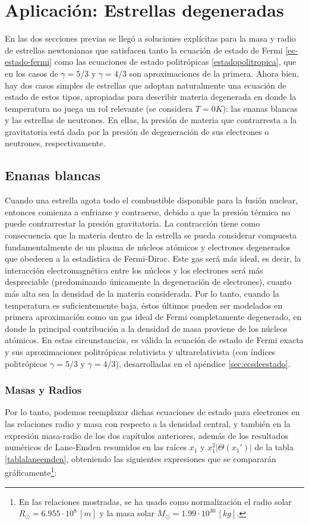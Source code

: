 \section{Aplicación: Estrellas degeneradas}
En las dos secciones previas se llegó a soluciones explícitas para la masa y radio de estrellas newtonianas que satisfacen tanto la ecuación de estado de Fermi \eqref{ec-estado-fermi} como las ecuaciones de estado politrópicas \eqref{estadopolitropica}, que en los casos de $\gamma=5/3$ y $\gamma=4/3$ son aproximaciones de la primera. Ahora bien, hay dos casos simples de estrellas que adoptan naturalmente una ecuación de estado de estos tipos, apropiadas para describir materia degenerada en donde la temperatura no juega un rol relevante (se considera $T=0 K$): las enanas blancas y las estrellas de neutrones. En ellas, la presión de materia que contrarresta a la gravitatoria está dada por la presión de degeneración de sus electrones o neutrones, respectivamente.


\subsection{Enanas blancas}\label{sec:enanasblancas}
Cuando una estrella agota todo el combustible disponible para la fusión nuclear, entonces comienza a enfriarse y contraerse, debido a que la presión térmica no puede contrarrestar la presión gravitatoria. La contracción tiene como consecuencia que la materia dentro de la estrella se pueda considerar compuesta fundamentalmente de un plasma de núcleos atómicos y electrones degenerados que obedecen a la estadística de Fermi-Dirac. Este gas será más ideal, es decir, la interacción electromagnética entre los núcleos y los electrones será más despreciable (predominando únicamente la degeneración de electrones), cuanto más alta sea la densidad de la materia considerada. Por lo tanto, cuando la temperatura es suficientemente baja, éstos últimos pueden ser modelados en primera aproximación como un gas ideal de Fermi completamente degenerado, en donde la principal contribución a la densidad de masa proviene de los núcleos atómicos. En estas circunstancias, es válida la ecuación de estado de Fermi exacta y sus aproximaciones politrópicas  relativista y ultrarelativista (con índices politrópicos $\gamma=5/3$ y $\gamma=4/3$), desarrolladas en el apéndice \ref{sec:ecsdeestado}.

\subsubsection{Masas y Radios}
Por lo tanto, podemos reemplazar dichas ecuaciones de estado para electrones en las relaciones radio y masa con respecto a la densidad central, y también en la expresión masa-radio de los dos capítulos anteriores, además de los resultados numéricos  de Lane-Emden resumidos en las raíces $x_1$ y $x_1^2\left|\Theta(x_1')\right|$ de la tabla \ref{tablalaneemden}, obteniendo las siguientes expresiones que se compararán gráficamente\footnote{En las relaciones mostradas, se ha usado como normalización el radio solar $R_{\odot}=6.955\cdot 10^{8}\,[m]$ y la masa solar $M_{\odot}=1.99\cdot10^{30}\,[kg]$.}:

